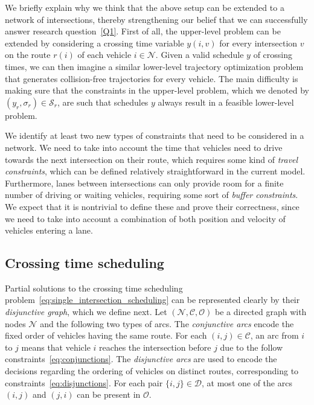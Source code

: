 \documentclass{article}
\theoremstyle{definition}
\theoremstyle{plain}
\begin{document}

We briefly explain why we think that the above setup can be extended to a
network of intersections, thereby strengthening our belief that we can
successfully answer research question~\ref{Q1}.
%
First of all, the upper-level problem can be extended by considering a crossing
time variable $y(i, v)$ for every intersection $v$ on the route $r(i)$ of each
vehicle $i\in \mathcal{N}$. Given a valid schedule $y$ of crossing times, we can
then imagine a similar lower-level trajectory optimization problem that
generates collision-free trajectories for every vehicle. The main difficulty is
making sure that the constraints in the upper-level problem, which we denoted by
$(y_{r}, \sigma_{r}) \in \mathcal{S}_{r}$, are such that schedules $y$ always
result in a feasible lower-level problem.

We identify at least two new types of constraints that need to be considered in
a network. We need to take into account the time that vehicles need to drive
towards the next intersection on their route, which requires some kind of
\textit{travel constraints}, which can be defined relatively straightforward in
the current model. Furthermore, lanes between intersections can only provide
room for a finite number of driving or waiting vehicles, requiring some sort of
\textit{buffer constraints}. We expect that it is nontrivial to define these and
prove their correctness, since we need to take into account a combination of
both position and velocity of vehicles entering a lane.


\subsection{Crossing time scheduling}

Partial solutions to the crossing time scheduling
problem~\eqref{eq:single_intersection_scheduling} can be represented
clearly by their \textit{disjunctive graph}, which we define next. Let
$(\mathcal{N}, \mathcal{C}, \mathcal{O})$ be a directed graph with nodes
$\mathcal{N}$ and the following two types of arcs. The \textit{conjunctive arcs}
encode the fixed order of vehicles having the same route. For each
$(i,j) \in \mathcal{C}$, an arc from $i$ to $j$ means that vehicle $i$ reaches
the intersection before $j$ due to the follow
constraints~\eqref{eq:conjunctions}. The \textit{disjunctive arcs} are used to
encode the decisions regarding the ordering of vehicles on distinct routes,
corresponding to constraints~\eqref{eq:disjunctions}. For each pair
$\{i,j\} \in \mathcal{D}$, at most one of the arcs $(i,j)$ and $(j,i)$ can be
present in $\mathcal{O}$.
\end{document}
